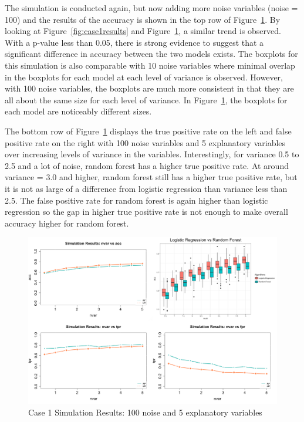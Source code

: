 \documentclass{llncs}
\begin{document}
The simulation is conducted again, but now adding more noise variables (noise = 100) and the results of the accuracy is shown in the top row of Figure~\ref{fig:case1resultsb}. By looking at Figure~\ref{fig:case1results} and Figure~\ref{fig:case1resultsb}, a similar trend is observed. With a p-value less than 0.05, there is strong evidence to suggest that a significant difference in accuracy between the two models exists. The boxplots for this simulation is also comparable with 10 noise variables where minimal overlap in the boxplots for each model at each level of variance is observed. However, with 100 noise variables, the boxplots are much more consistent in that they are all about the same size for each level of variance.  In Figure~\ref{fig:case1resultsb}, the boxplots for each model are noticeably different sizes.

The bottom row of Figure~\ref{fig:case1resultsb} displays the true positive rate on the left and false positive rate on the right with 100 noise variables and 5 explanatory variables over increasing levels of variance in the variables. Interestingly, for variance 0.5 to 2.5 and a lot of noise, random forest has a higher true positive rate.  At around variance = 3.0 and higher, random forest still has a higher true positive rate, but it is not as large of a difference from logistic regression than variance less than 2.5. The false positive rate for random forest is again higher than logistic regression so the gap in higher true positive rate is not enough to make overall accuracy higher for random forest.

\begin{figure}
\centering
\includegraphics[scale=0.55]{case1_b.png}
\caption{Case 1 Simulation Results: 100 noise and 5 explanatory variables}
\label{fig:case1resultsb}
\end{figure}
\end{document}
